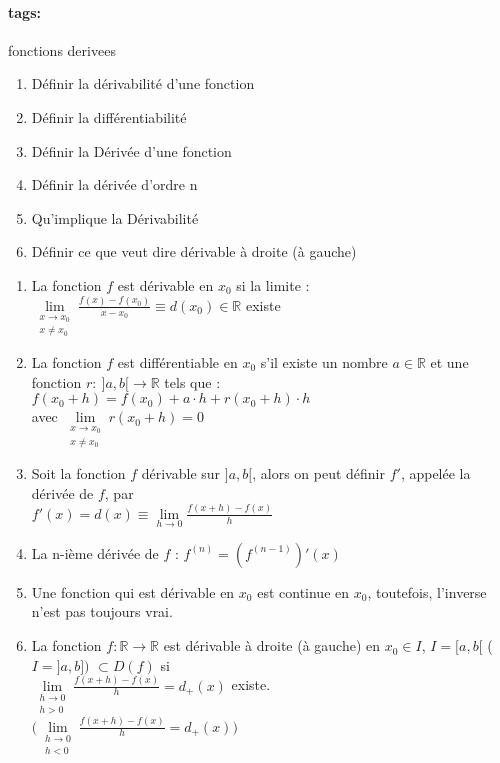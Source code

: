 \documentclass[12pt]{article}
\newcommand*{\xfield}[1]{\begin{mdframed}\centering #1\end{mdframed}\bigskip}
\newenvironment{note}{}{}
\newcommand*{\tags}[1]{\paragraph{tags: }#1}
\begin{document}
\begin{note}
	\tags{fonctions derivees}
	\xfield{\begin{enumerate}
		\item Définir la dérivabilité d'une fonction
		\item Définir la différentiabilité
		\item Définir la Dérivée d'une fonction
		\item Définir la dérivée d'ordre n
		\item Qu'implique la Dérivabilité
		\item Définir ce que veut dire dérivable à droite (à gauche)
	\end{enumerate} }
	\xfield{\begin{enumerate}
		\item La fonction $f$ est dérivable en $x_0$ si la limite :\\
			$\lim\limits_{\substack{x\to x_0\\x \neq x_0}} \frac{f(x)-f(x_0)}{x-x_0} \equiv d(x_0) \in \mathbb{R}$ existe
		\item La fonction $f$ est différentiable en $x_0$ s'il existe un nombre $a \in \mathbb{R}$ et une fonction $r:\ ]a,b[ \to \mathbb{R}$ tels que :\\
		$f(x_0 + h) = f(x_0) + a \cdot h + r(x_0 + h) \cdot h$\\
		avec $\lim\limits_{\substack{x\to x_0\\x \neq  x_0}} r(x_0+h) = 0$
		\item Soit la fonction $f$ dérivable sur $]a,b[$, alors on peut définir $f'$, appelée la dérivée de $f$, par \\
		$f'(x) = d(x) \equiv \lim\limits_{h \to 0} \frac{f(x+h)-f(x)}{h}$
		\item La n-ième dérivée de $f$ : $f^{(n)} = (f^{(n-1)})'(x)$
		\item Une fonction qui est dérivable en $x_0$ est continue en $x_0$, toutefois, l'inverse n'est pas toujours vrai.
		\item La fonction $f : \mathbb{R} \rightarrow \mathbb{R}$ est dérivable à droite (à gauche) en $x_0 \in I$, $I = [a,b[$  ($I = ]a,b])$ $\subset D(f)$ si \\
		$\lim\limits_{\substack{h \to 0\\ h > 0}} \frac{f(x+h)-f(x)}{h} = d_+(x)$ existe.\\
		$\big(\lim\limits_{\substack{h \to 0\\ h < 0}} \frac{f(x+h)-f(x)}{h} = d_+(x)\big)$
	\end{enumerate} }
\end{note}
\end{document}
